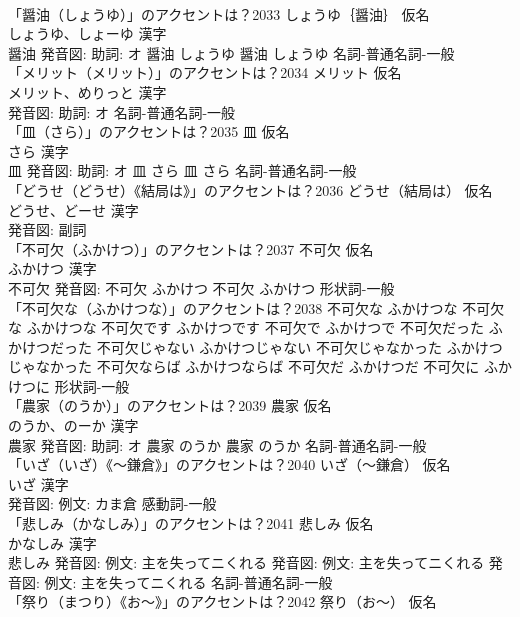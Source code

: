 \documentclass[8pt]{extreport}
\begin{document}
\begin{CJK}{UTF8}{min}
\\	「醤油（しょうゆ）」のアクセントは？2033	しょうゆ｛醤油｝ 仮名　
\\	しょうゆ、しょーゆ 漢字　
\\	醤油 発音図: 助詞: オ	醤油 しょうゆ		醤油 しょうゆ				名詞-普通名詞-一般 
\\	「メリット（メリット）」のアクセントは？2034	メリット 仮名　
\\	メリット、めりっと 漢字　
\\	発音図: 助詞: オ							名詞-普通名詞-一般 
\\	「皿（さら）」のアクセントは？2035	皿 仮名　
\\	さら 漢字　
\\	皿 発音図: 助詞: オ	皿 さら		皿 さら				名詞-普通名詞-一般 
\\	「どうせ（どうせ）《結局は》」のアクセントは？2036	どうせ（結局は） 仮名　
\\	どうせ、どーせ 漢字　
\\	発音図:							副詞 
\\	「不可欠（ふかけつ）」のアクセントは？2037	不可欠 仮名　
\\	ふかけつ 漢字　
\\	不可欠 発音図:	不可欠 ふかけつ		不可欠 ふかけつ				形状詞-一般 
\\	「不可欠な（ふかけつな）」のアクセントは？2038		不可欠な ふかけつな		不可欠な ふかけつな 不可欠です ふかけつです 不可欠で ふかけつで 不可欠だった ふかけつだった 不可欠じゃない ふかけつじゃない 不可欠じゃなかった ふかけつじゃなかった 不可欠ならば ふかけつならば 不可欠だ ふかけつだ 不可欠に ふかけつに				形状詞-一般 
\\	「農家（のうか）」のアクセントは？2039	農家 仮名　
\\	のうか、のーか 漢字　
\\	農家 発音図: 助詞: オ	農家 のうか		農家 のうか				名詞-普通名詞-一般 
\\	「いざ（いざ）《〜鎌倉》」のアクセントは？2040	いざ（〜鎌倉） 仮名　
\\	いざ 漢字　
\\	発音図: 例文: カま倉							感動詞-一般 
\\	「悲しみ（かなしみ）」のアクセントは？2041	悲しみ 仮名　
\\	かなしみ 漢字　
\\	悲しみ 発音図: 例文: 主を失ってニくれる 発音図: 例文: 主を失ってニくれる 発音図: 例文: 主を失ってニくれる							名詞-普通名詞-一般 
\\	「祭り（まつり）《お〜》」のアクセントは？2042	祭り（お〜） 仮名　

\end{CJK}
\end{document}

